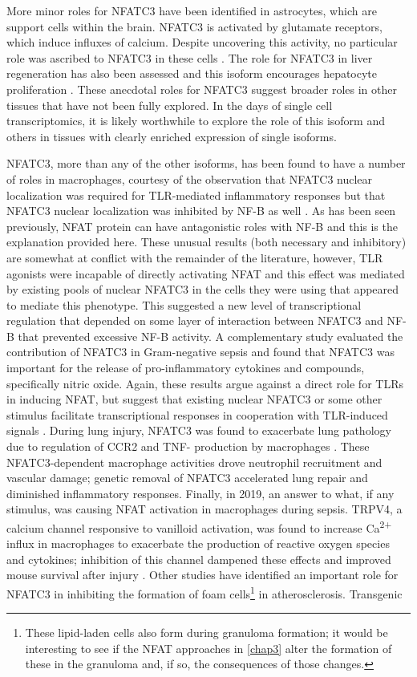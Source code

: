 More minor roles for NFATC3 have been identified in astrocytes, which are support cells within the brain. NFATC3 is activated by glutamate receptors, which induce influxes of calcium. Despite uncovering this activity, no particular role was ascribed to NFATC3 in these cells \citep{Jones2003}. The role for NFATC3 in liver regeneration has also been assessed and this isoform encourages hepatocyte proliferation \citep{Pierre2009}. These anecdotal roles for NFATC3 suggest broader roles in other tissues that have not been fully explored. In the days of single cell transcriptomics, it is likely worthwhile to explore the role of this isoform and others in tissues with clearly enriched expression of single isoforms.

NFATC3, more than any of the other isoforms, has been found to have a number of roles in macrophages, courtesy of the observation that NFATC3 nuclear localization was required for TLR-mediated inflammatory responses \citep{Minematsu2011} but that NFATC3 nuclear localization was inhibited by NF-\textkappa B as well \citep{Conboy1999}. As has been seen previously, NFAT protein can have antagonistic roles with NF-\textkappa B and this is the explanation provided here. These unusual results (both necessary and inhibitory) are somewhat at conflict with the remainder of the literature, however, TLR agonists were incapable of directly activating NFAT and this effect was mediated by existing pools of nuclear NFATC3 in the cells they were using that appeared to mediate this phenotype. This suggested a new level of transcriptional regulation that depended on some layer of interaction between NFATC3 and NF-\textkappa B that prevented excessive NF-\textkappa B activity. A complementary study evaluated the contribution of NFATC3 in Gram-negative sepsis and found that NFATC3 was important for the release of pro-inflammatory cytokines and compounds, specifically nitric oxide. Again, these results argue against a direct role for TLRs in inducing NFAT, but suggest that existing nuclear NFATC3 or some other stimulus facilitate transcriptional responses in cooperation with TLR-induced signals \citep{Ranjan2014}. During lung injury, NFATC3 was found to exacerbate lung pathology due to regulation of CCR2 and TNF-\textalpha{} production by macrophages \citep{Karpurapu2018}. These NFATC3-dependent macrophage activities drove neutrophil recruitment and vascular damage; genetic removal of NFATC3 accelerated lung repair and diminished inflammatory responses. Finally, in 2019, an answer to what, if any stimulus, was causing NFAT activation in macrophages during sepsis. TRPV4, a calcium channel responsive to vanilloid activation, was found to increase Ca\textsuperscript{2+} influx in macrophages to exacerbate the production of reactive oxygen species and cytokines; inhibition of this channel dampened these effects and improved mouse survival after injury \citep{Li2019}. Other studies have identified an important role for NFATC3 in inhibiting the formation of foam cells\footnote{These lipid-laden cells also form during granuloma formation; it would be interesting to see if the NFAT approaches in \autoref{chap3} alter the formation of these in the granuloma and, if so, the consequences of those changes.} in atherosclerosis. Transgenic 